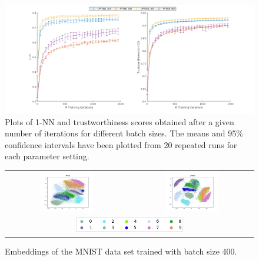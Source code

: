 \begin{figure}[!htb]
  \centering
  \includegraphics[width=\textwidth]{images/learning_curves.png}
  \caption{Plots of 1-NN and trustworthiness scores obtained after a given number of iterations for different batch sizes. The means and 95\% confidence intervals have been plotted from 20 repeated runs for each parameter setting.}
  \label{fig:mnist_knn_trustworthiness}
\end{figure}

\begin{figure}[!htb]
  \centering
  \begin{tabular}{cc}
    \includegraphics[width=0.45\textwidth]{images/mnist_ptsne_embedding.png} &
    \includegraphics[width=0.45\textwidth]{images/mnist_vptsne_embedding.png} \\
    \multicolumn{2}{c}{\includegraphics[width=0.45\textwidth]{images/mnist_legend.png}}
  \end{tabular}
  \caption{Embeddings of the MNIST data set trained with batch size 400.}
  \label{fig:mnist_comparison}
\end{figure}

